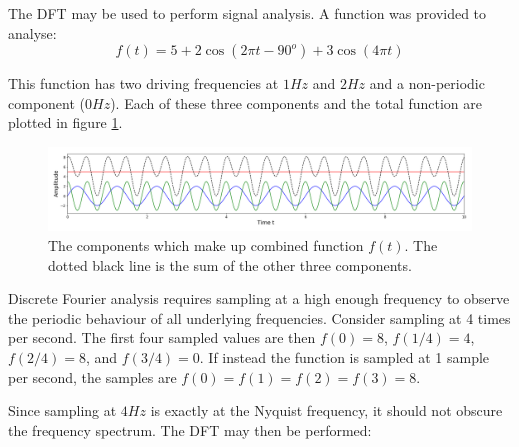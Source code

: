 \message{ !name(Assn2.tex)}\documentclass[twocolumn]{article}
\begin{document}
The DFT may be used to perform signal analysis. A function was provided to analyse:
\begin{equation}
f(t) = 5 + 2\cos(2\pi t - 90^o) + 3\cos(4\pi t)
\end{equation}

This function has two driving frequencies at $1Hz$ and $2Hz$ and a non-periodic component ($0Hz$). Each of these three components and the total function are plotted in figure \ref{fig:3functions}.

\begin{figure}
\centering
\includegraphics[width=\textwidth]{"3 functions"}
\caption{The components which make up combined function $f(t)$. The dotted black line is the sum of the other three components.}
\label{fig:3functions}
\end{figure}

Discrete Fourier analysis requires sampling at a high enough frequency to observe the periodic behaviour of all underlying frequencies. Consider sampling at 4 times per second. The first four sampled values are then $f(0)= 8$, $f(1/4)=4$, $f(2/4)=8$, and $f(3/4)=0$. If instead the function is sampled at 1 sample per second, the samples are $f(0)=f(1)=f(2)=f(3)=8$. 

Since sampling at $4Hz$ is exactly at the Nyquist frequency, it should not obscure the frequency spectrum. The DFT may then be performed:
\end{document}
